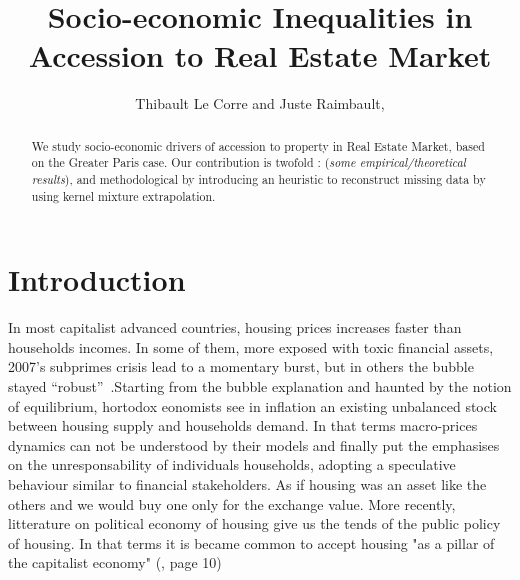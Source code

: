 

\title{
Socio-economic Inequalities in Accession to Real Estate Market
}

\author{Thibault Le Corre and Juste Raimbault,}




\begin{abstract}
We study socio-economic drivers of accession to property in Real Estate Market, based on the Greater Paris case. Our contribution is twofold : (\textit{some empirical/theoretical results}), and methodological by introducing an heuristic to reconstruct missing data by using kernel mixture extrapolation.
\end{abstract}


\maketitle


\section{Introduction}

In most capitalist advanced countries, housing prices increases faster than households incomes. In some of them, more exposed with toxic financial assets, 2007's subprimes crisis lead to a momentary burst, but in others the bubble stayed ``robust''~\cite{timbeau2013bulles}.Starting from the bubble explanation and haunted by the notion of equilibrium, hortodox eonomists see in inflation an existing unbalanced stock between housing supply and households demand. In that terms macro-prices dynamics can not be understood by their models and finally put the emphasises on the unresponsability of individuals households, adopting a speculative behaviour similar to financial stakeholders. As if housing was an asset like the others and we would buy one only for the exchange value.
More recently, litterature on political economy of housing give us the tends of the public policy of housing. In that terms it is became common to accept housing "as a pillar of the capitalist economy" (\cite{aalbers2016financialization}, page 10)

